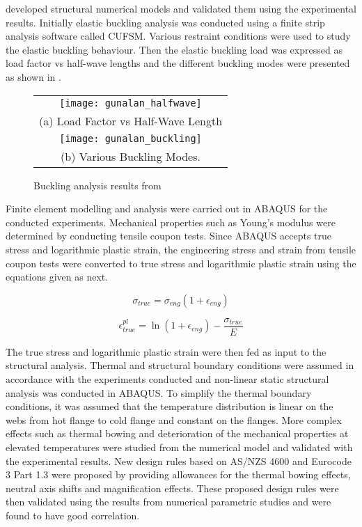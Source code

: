  developed structural numerical models and validated them using the experimental results. Initially elastic buckling analysis was conducted using a finite strip analysis software called CUFSM. Various restraint conditions were used to study the elastic buckling behaviour. Then the elastic buckling load was expressed as load factor vs half-wave lengths and the different buckling modes were presented as shown in .
\begin{figure}[htbp]
	\centering
		\begin{tabular}{c}
			\texttt{[image: gunalan\_halfwave]} \\ 
			(a)	Load Factor vs Half-Wave Length\\ 
			\texttt{[image: gunalan\_buckling]} \\ 
			(b)	Various Buckling Modes. \\ 
		\end{tabular} 
		\caption{Buckling analysis results from \citet{Gunalan2013f}}
		\label{fig:gunalan_buckling}
\end{figure}

Finite element modelling and analysis were carried out in ABAQUS for the conducted experiments. Mechanical properties such as Young’s modulus were determined by conducting tensile coupon tests. Since ABAQUS accepts true stress and logarithmic plastic strain, the engineering stress and strain from tensile coupon tests were converted to true stress and logarithmic plastic strain using the equations given as next.

\begin{equation}
\sigma_{true} = \sigma_{eng}(1+\epsilon_{eng})
\end{equation}

\begin{equation}
\epsilon_{true}^{pl} = \ln(1+\epsilon_{eng})-\dfrac{\sigma_{true}}{E}
\end{equation}

The true stress and logarithmic plastic strain were then fed as input to the structural analysis. Thermal and structural boundary conditions were assumed in accordance with the experiments conducted and non-linear static structural analysis was conducted in ABAQUS. To simplify the thermal boundary conditions, it was assumed that the temperature distribution is linear on the webs from hot flange to cold flange and constant on the flanges. More complex effects such as thermal bowing and deterioration of the mechanical properties at elevated temperatures were studied from the numerical model and validated with the experimental results. New design rules based on AS/NZS 4600 and Eurocode 3 Part 1.3 were proposed by providing allowances for the thermal bowing effects, neutral axis shifts and magnification effects. These proposed design rules were then validated using the results from numerical parametric studies and were found to have good correlation.


